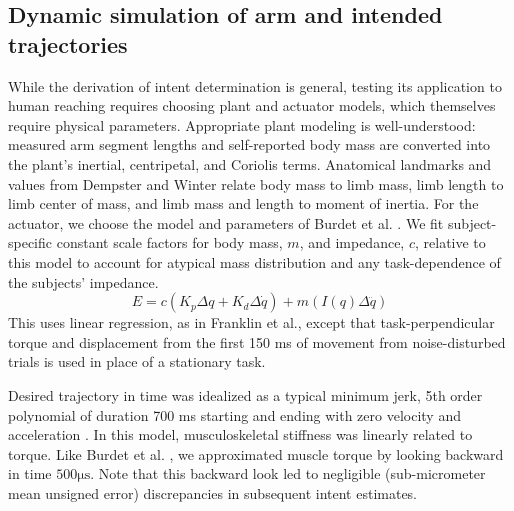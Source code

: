 \subsection*{Dynamic simulation of arm and intended trajectories}
While the derivation of intent determination is general, testing its application to human reaching requires choosing plant and actuator models, which themselves require physical parameters. Appropriate plant modeling is well-understood: measured arm segment lengths and self-reported body mass are converted into the plant's inertial, centripetal, and Coriolis terms. Anatomical landmarks and values from Dempster \cite{dempster1955space} and Winter \cite{winter2009biomechanics} relate body mass to limb mass, limb length to limb center of mass, and limb mass and length to moment of inertia. For the actuator, we choose the model and parameters of Burdet et al. \cite{burdet2006stability}. We fit subject-specific constant scale factors for body mass, $m$, and impedance, $c$, relative to this model to account for atypical mass distribution and any task-dependence of the subjects' impedance\cite{gomi1998task}.
\begin{equation}
E=c(K_p\Delta q+K_d \Delta \dot{q})+m(I(q)\Delta\ddot{q})
\end{equation}
This uses linear regression, as in Franklin et al.\cite{franklin2003adaptation}, except that task-perpendicular torque and displacement from the first 150 ms of movement from noise-disturbed trials is used in place of a stationary task.  

Desired trajectory in time was idealized as a typical minimum jerk, 5th order polynomial of duration 700 ms starting and ending with zero velocity and acceleration \cite{flash1985coordination}.  In this  model, musculoskeletal stiffness was linearly related to torque. Like Burdet et al. \cite{burdet2006stability}, we approximated muscle torque by looking backward in time $500 \mathrm{\mu s}$. Note that this backward look led to negligible (sub-micrometer mean unsigned error) discrepancies in subsequent intent estimates. 

